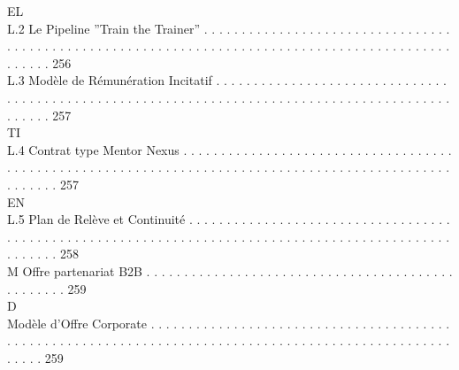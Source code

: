 \vspace{0.5em}
\vspace{0.5em}
EL\\
L.2     Le Pipeline ”Train the Trainer” . . . . . . . . . . . . . . . . . . . . . . . . . . . . . . . . . . . . . . . . . . . . . . . . . . . . . . . . . . . . . . . . . . . . . . . . . . . . . . . . . . . . . . . . . . . . . . . . . . 256\\
L.3     Modèle de Rémunération Incitatif . . . . . . . . . . . . . . . . . . . . . . . . . . . . . . . . . . . . . . . . . . . . . . . . . . . . . . . . . . . . . . . . . . . . . . . . . . . . . . . . . . . . . . . . . . . . . . . . 257\\
\vspace{0.5em}
\vspace{0.5em}
\vspace{0.5em}
\vspace{0.5em}
TI\\
L.4     Contrat type Mentor Nexus . . . . . . . . . . . . . . . . . . . . . . . . . . . . . . . . . . . . . . . . . . . . . . . . . . . . . . . . . . . . . . . . . . . . . . . . . . . . . . . . . . . . . . . . . . . . . . . . . . . . . . 257\\
\vspace{0.5em}
\vspace{0.5em}
\vspace{0.5em}
\vspace{0.5em}
EN\\
L.5     Plan de Relève et Continuité . . . . . . . . . . . . . . . . . . . . . . . . . . . . . . . . . . . . . . . . . . . . . . . . . . . . . . . . . . . . . . . . . . . . . . . . . . . . . . . . . . . . . . . . . . . . . . . . . . . . . 258\\
\vspace{0.5em}
M     Offre partenariat B2B . . . . . . . . . . . . . . . . . . . . . . . . . . . . . . . . . . . . . . . . . . . . . . . . . 259\\
\vspace{0.5em}
\vspace{0.5em}
\vspace{0.5em}
\vspace{0.5em}
D\\
Modèle d’Offre Corporate . . . . . . . . . . . . . . . . . . . . . . . . . . . . . . . . . . . . . . . . . . . . . . . . . . . . . . . . . . . . . . . . . . . . . . . . . . . . . . . . . . . . . . . . . . . . . . . . . . . . . . . . 259\\
\vspace{0.5em}
